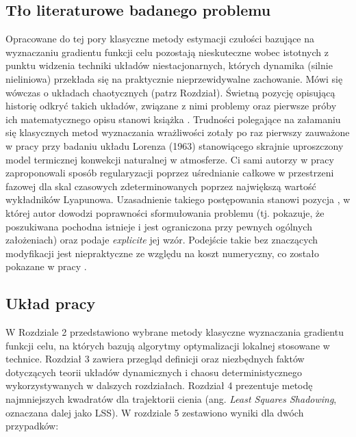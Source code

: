 \documentclass[12pt]{article}
\begin{document}
\subsection{Tło literaturowe badanego problemu}
Opracowane do tej pory klasyczne metody estymacji czułości bazujące na wyznaczaniu gradientu funkcji celu pozostają nieskuteczne wobec istotnych z punktu widzenia techniki układów niestacjonarnych, których dynamika (silnie nieliniowa) przekłada się na praktycznie nieprzewidywalne zachowanie. Mówi się wówczas o układach chaotycznych (patrz Rozdział). Świetną pozycję opisującą historię odkryć takich układów, związane z nimi problemy oraz pierwsze próby ich matematycznego opisu stanowi książka \cite{Gleick}. Trudności polegające na załamaniu się klasycznych metod wyznaczania wrażliwości zotały po raz pierwszy zauważone w pracy \cite{Lea1} przy badaniu układu Lorenza (1963) stanowiącego skrajnie uproszczony model termicznej konwekcji naturalnej w atmosferze. Ci sami autorzy w pracy \cite{Lea2} zaproponowali sposób regularyzacji poprzez uśrednianie całkowe w przestrzeni fazowej dla skal czasowych zdeterminowanych poprzez największą wartość wykładników Lyapunowa. Uzasadnienie takiego postępowania stanowi pozycja \cite{Ruelle1}, w której autor dowodzi poprawności sformułowania problemu (tj. pokazuje, że poszukiwana pochodna istnieje i jest ograniczona przy pewnych ogólnych założeniach) oraz podaje \textit{explicite} jej wzór. Podejście takie bez znaczących modyfikacji jest niepraktyczne ze względu na koszt numeryczny, co zostało pokazane w pracy \cite{Chandramoorthy}.
\subsection{Układ pracy}
W Rozdziale 2 przedstawiono wybrane metody klasyczne wyznaczania gradientu funkcji celu, na których bazują algorytmy optymalizacji lokalnej stosowane w technice. Rozdział 3 zawiera przegląd definicji oraz niezbędnych faktów dotyczących teorii układów dynamicznych i chaosu deterministycznego wykorzystywanych w dalszych rozdziałach. Rozdział 4 prezentuje metodę najmniejszych kwadratów dla trajektorii cienia (ang. \textit{Least Squares Shadowing}, oznaczana dalej jako LSS). W rozdziale 5 zestawiono wyniki dla dwóch przypadków:
\newpage
\newpage
\end{document}
